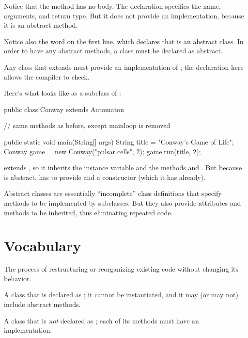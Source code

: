 Notice that the  method has no body.
The declaration specifies the name, arguments, and return type.
But it does not provide an implementation, because it is an abstract method.

Notice also the word  on the first line, which declares that  is an abstract class.
In order to have any abstract methods, a class must be declared as abstract.

Any class that extends  must provide an implementation of ; the declaration here allows the compiler to check.

Here's what  looks like as a subclass of :

\begin{code}
public class Conway extends Automaton {

    // same methods as before, except mainloop is removed

    public static void main(String[] args) {
        String title = "Conway's Game of Life";
        Conway game = new Conway("pulsar.cells", 2);
        game.run(title, 2);
    }
}
\end{code}

 extends , so it inherits the  instance variable  and the methods  and .
But because  is abstract,  has to provide  and a constructor (which it has already).

Abstract classes are essentially ``incomplete'' class definitions that specify methods to be implemented by subclasses.
But they also provide attributes and methods to be inherited, thus eliminating repeated code.


\section{Vocabulary}

\begin{description}

The process of restructuring or reorganizing existing code without changing its behavior.

A class that is declared as ; it cannot be instantiated, and it may (or may not) include abstract methods.

A class that is {\em not} declared as ; each of its methods must have an implementation.

\end{description}


